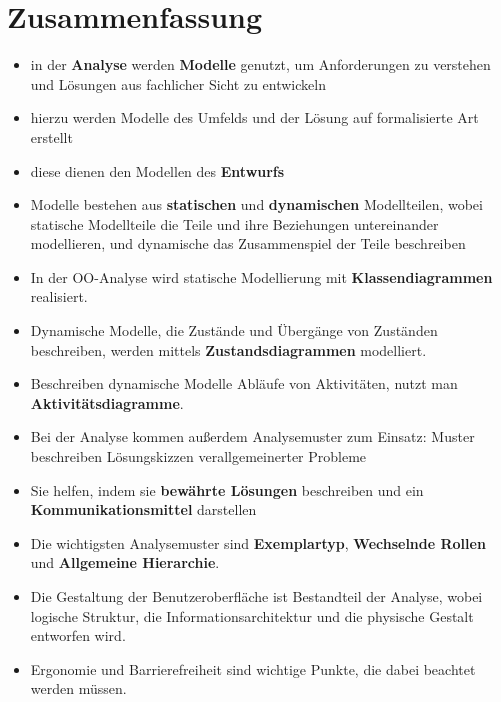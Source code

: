 \section{Zusammenfassung}


\begin{itemize}
    \item in der \textbf{Analyse} werden \textbf{Modelle} genutzt, um Anforderungen zu verstehen und Lösungen aus fachlicher Sicht zu entwickeln
    \item hierzu werden Modelle des Umfelds und der Lösung auf formalisierte Art erstellt
    \item diese dienen den Modellen des \textbf{Entwurfs}
    \item Modelle bestehen aus \textbf{statischen} und \textbf{dynamischen} Modellteilen, wobei statische Modellteile die Teile und ihre Beziehungen untereinander modellieren, und dynamische das Zusammenspiel der Teile beschreiben
    \item In der OO-Analyse wird statische Modellierung mit \textbf{Klassendiagrammen} realisiert.
    \item[] Dynamische Modelle, die Zustände und Übergänge von Zuständen beschreiben, werden mittels \textbf{Zustandsdiagrammen} modelliert.
    \item[] Beschreiben dynamische Modelle Abläufe von Aktivitäten, nutzt man \textbf{Aktivitätsdiagramme}.
    \item Bei der Analyse kommen außerdem Analysemuster zum Einsatz: Muster beschreiben Lösungskizzen verallgemeinerter Probleme
    \item[] Sie helfen, indem sie \textbf{bewährte Lösungen} beschreiben und ein \textbf{Kommunikationsmittel} darstellen
    \item Die wichtigsten Analysemuster sind \textbf{Exemplartyp}, \textbf{Wechselnde Rollen} und \textbf{Allgemeine Hierarchie}.
    \item Die Gestaltung der Benutzeroberfläche ist Bestandteil der Analyse, wobei logische Struktur, die Informationsarchitektur und die physische Gestalt entworfen wird.
    \item[] Ergonomie und Barrierefreiheit sind wichtige Punkte, die dabei beachtet werden müssen.
\end{itemize}